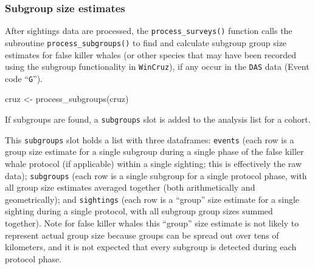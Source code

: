 \documentclass[
]{book}
\newenvironment{Shaded}{\begin{snugshade}}{\end{snugshade}}
\newcommand{\DecValTok}[1]{\textcolor[rgb]{0.00,0.00,0.81}{#1}}
\newcommand{\FunctionTok}[1]{\textcolor[rgb]{0.00,0.00,0.00}{#1}}
\newcommand{\NormalTok}[1]{#1}
\newcommand{\OtherTok}[1]{\textcolor[rgb]{0.56,0.35,0.01}{#1}}
\newcommand{\SpecialCharTok}[1]{\textcolor[rgb]{0.00,0.00,0.00}{#1}}
\newcommand{\StringTok}[1]{\textcolor[rgb]{0.31,0.60,0.02}{#1}}
\begin{document}
\hypertarget{subgroups}{%
\subsubsection*{Subgroup size estimates}\label{subgroups}}

After sightings data are processed, the \texttt{process\_surveys()} function calls the subroutine \texttt{process\_subgroups()} to find and calculate subgroup group size estimates for false killer whales (or other species that may have been recorded using the subgroup functionality in \texttt{WinCruz}), if any occur in the \texttt{DAS} data (Event code ``\texttt{G}'').

\begin{Shaded}
\begin{Highlighting}[]
\NormalTok{cruz }\OtherTok{\textless{}{-}} \FunctionTok{process\_subgroups}\NormalTok{(cruz) }
\end{Highlighting}
\end{Shaded}

If subgroups are found, a \texttt{subgroups} slot is added to the analysis list for a cohort.

\begin{Shaded}
\end{Shaded}

This \texttt{subgroups} slot holds a list with three dataframes: \texttt{events} (each row is a group size estimate for a single subgroup during a single phase of the false killer whale protocol (if applicable) within a single sighting; this is effectively the raw data); \texttt{subgroups} (each row is a single subgroup for a single protocol phase, with all group size estimates averaged together (both arithmetically and geometrically); and \texttt{sightings} (each row is a ``group'' size estimate for a single sighting during a single protocol, with all subgroup group sizes summed together). Note for false killer whales this ``group'' size estimate is not likely to represent actual group size because groups can be spread out over tens of kilometers, and it is not expected that every subgroup is detected during each protocol phase.
\end{document}
